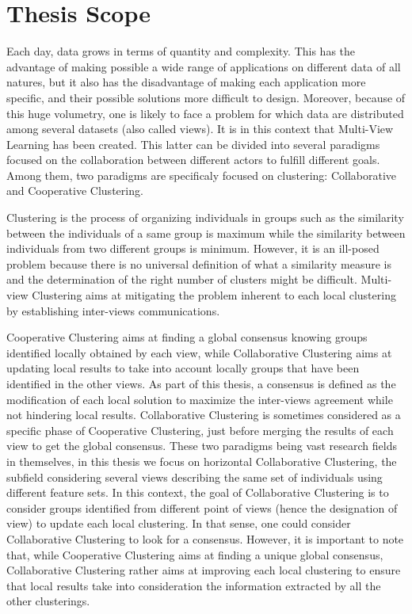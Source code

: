 \section{Thesis Scope}

Each day, data grows in terms of quantity and complexity. This has the advantage of making possible a wide range of applications on different data of all natures, but it also has the disadvantage of making each application more specific, and their possible solutions more difficult to design. Moreover, because of this huge volumetry, one is likely to face a problem for which data are distributed among several datasets (also called views). It is in this context that Multi-View Learning has been created. This latter can be divided into several paradigms focused on the collaboration between different actors to fulfill different goals. Among them, two paradigms are specificaly focused on clustering: Collaborative and Cooperative Clustering.

Clustering is the process of organizing individuals in groups such as the similarity between the individuals of a same group is maximum while the similarity between individuals from two different groups is minimum. However, it is an ill-posed problem because there is no universal definition of what a similarity measure is and the determination of the right number of clusters might be difficult. Multi-view Clustering aims at mitigating the problem inherent to each local clustering by establishing inter-views communications.

Cooperative Clustering aims at finding a global consensus knowing groups identified locally obtained by each view, while Collaborative Clustering aims at updating local results to take into account locally groups that have been identified in the other views. As part of this thesis, a consensus is defined as the modification of each local solution to maximize the inter-views agreement while not hindering local results. Collaborative Clustering is sometimes considered as a specific phase of Cooperative Clustering, just before merging the results of each view to get the global consensus. These two paradigms being vast research fields in themselves, in this thesis we focus on horizontal Collaborative Clustering, the subfield considering several views describing the same set of individuals using different feature sets. In this context, the goal of Collaborative Clustering is to consider groups identified from different point of views (hence the designation of view) to update each local clustering. In that sense, one could consider Collaborative Clustering to look for a consensus. However, it is important to note that, while Cooperative Clustering aims at finding a unique global consensus, Collaborative Clustering rather aims at improving each local clustering to ensure that local results take into consideration the information extracted by all the other clusterings.

